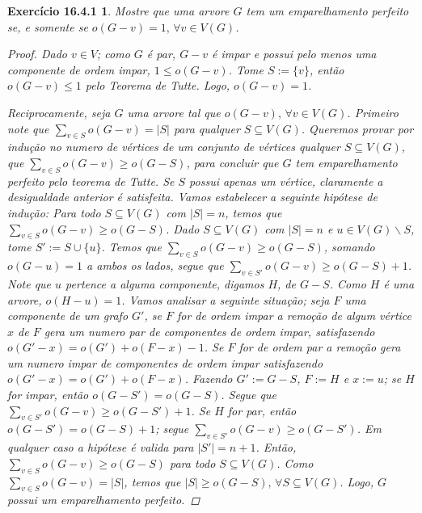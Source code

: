 \documentclass[a4paper,12pt]{article}
\newtheorem*{14}{Exercício 16.4.1}
\begin{document}
\begin{14}

Mostre que uma arvore $G$ tem um emparelhamento perfeito se, e somente se $o(G-v) = 1,\, \forall v \in V(G)$.

\begin{proof}

Dado $v \in V$; como $G$ é par, $G-v$ é impar e possui pelo menos uma componente de ordem impar, $1 \leq o(G-v)$. Tome $S := \{v\}$, então $o(G-v) \leq 1$ pelo Teorema de Tutte. Logo, $o(G-v) = 1$.

Reciprocamente, seja $G$ uma arvore tal que $o(G-v),\, \forall v \in V(G)$. Primeiro note que $\sum_{v \in S} o(G-v) = |S|$ para qualquer $S \subseteq V(G)$. Queremos provar por indução no numero de vértices de um conjunto de vértices qualquer $S \subseteq V(G)$, que $\sum_{v \in S} o(G-v) \geq o(G-S)$, para concluir que $G$ tem emparelhamento perfeito pelo teorema de Tutte. Se $S$ possui apenas um vértice, claramente a desigualdade anterior é satisfeita. Vamos estabelecer a seguinte hipótese de indução: Para todo $S \subseteq V(G)$ com $|S| = n$, temos que $\sum_{v \in S} o(G-v) \geq o(G-S)$. Dado $S \subseteq V(G)$ com $|S| = n$ e $u \in V(G) \backslash S$, tome $S' := S \cup \{u\}$. Temos que $\sum_{v \in S} o(G-v) \geq o(G-S)$, somando $o(G-u) = 1$ a ambos os lados, segue que $\sum_{v \in S'} o(G-v) \geq o(G-S) + 1$. Note que $u$ pertence a  alguma componente, digamos $H$, de $G-S$. Como $H$ é uma arvore, $o(H-u) = 1$. Vamos analisar a seguinte situação; seja $F$ uma componente de um grafo $G'$, se $F$ for de ordem impar a remoção de algum vértice $x$ de $F$ gera um numero par de componentes de ordem impar, satisfazendo $o(G'-x) = o(G') + o(F-x) - 1$. Se $F$ for de ordem par a remoção gera um numero impar de componentes de ordem impar satisfazendo $o(G'-x) = o(G') + o(F-x)$. Fazendo $G' := G-S$, $F := H$ e $x := u$; se $H$ for impar, então $o(G-S') = o(G-S)$.
Segue que $\sum_{v \in S'} o(G-v) \geq o(G-S') + 1$. Se $H$ for par, então $o(G-S') = o(G-S) + 1$; segue $\sum_{v \in S'} o(G-v) \geq o(G-S')$. Em qualquer caso a hipótese é valida para $|S'| = n + 1$. Então, $\sum_{v \in S} o(G-v) \geq o(G-S)$ para todo $S \subseteq V(G)$. Como $\sum_{v \in S} o(G-v) = |S|$, temos que $|S| \geq o(G-S),\, \forall S \subseteq V(G)$. Logo, $G$ possui um emparelhamento perfeito.

\end{proof}

\end{14}
\end{document}
